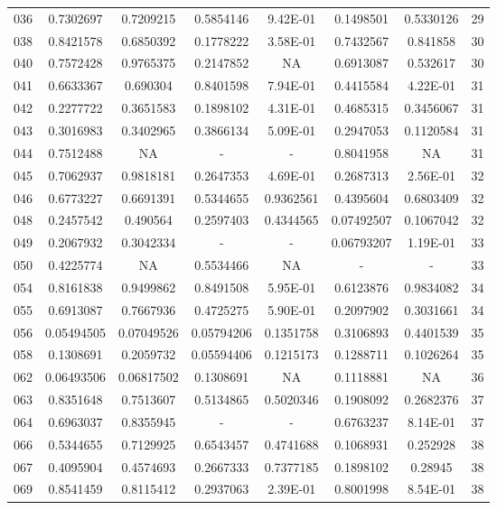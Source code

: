 \begin{anexosenv}
{\begin{longtable}{cccccccc}
036 & 0.7302697 & 0.7209215 & 0.5854146 & 9.42E-01 & 0.1498501 & 0.5330126 & 29 \\ 
038 & 0.8421578 & 0.6850392 & 0.1778222 & 3.58E-01 & 0.7432567 & 0.841858 & 30 \\ 
040 & 0.7572428 & 0.9765375 & 0.2147852 & NA & 0.6913087 & 0.532617 & 30 \\ 
041 & 0.6633367 & 0.690304 & 0.8401598 & 7.94E-01 & 0.4415584 & 4.22E-01 & 31 \\ 
042 & 0.2277722 & 0.3651583 & 0.1898102 & 4.31E-01 & 0.4685315 & 0.3456067 & 31 \\ 
043 & 0.3016983 & 0.3402965 & 0.3866134 & 5.09E-01 & 0.2947053 & 0.1120584 & 31 \\ 
044 & 0.7512488 & NA & - & - &  0.8041958 & NA & 31 \\ 
045 & 0.7062937 & 0.9818181 & 0.2647353 & 4.69E-01 & 0.2687313 & 2.56E-01 & 32 \\ 
046 & 0.6773227 & 0.6691391 & 0.5344655 & 0.9362561 & 0.4395604 & 0.6803409 & 32 \\ 
048 & 0.2457542 & 0.490564 & 0.2597403 & 0.4344565 & 0.07492507 & 0.1067042 & 32 \\ 
049 & 0.2067932 & 0.3042334 & - & - &  0.06793207 & 1.19E-01 & 33 \\ 
050 & 0.4225774 & NA & 0.5534466 & NA & - & - &  33 \\ 
054 & 0.8161838 & 0.9499862 & 0.8491508 & 5.95E-01 & 0.6123876 & 0.9834082 & 34 \\ 
055 & 0.6913087 & 0.7667936 & 0.4725275 & 5.90E-01 & 0.2097902 & 0.3031661 & 34 \\ 
056 & 0.05494505 & 0.07049526 & 0.05794206 & 0.1351758 & 0.3106893 & 0.4401539 & 35 \\ 
058 & 0.1308691 & 0.2059732 & 0.05594406 & 0.1215173 & 0.1288711 & 0.1026264 & 35 \\ 
062 & 0.06493506 & 0.06817502 & 0.1308691 & NA & 0.1118881 & NA & 36 \\ 
063 & 0.8351648 & 0.7513607 & 0.5134865 & 0.5020346 & 0.1908092 & 0.2682376 & 37 \\ 
064 & 0.6963037 & 0.8355945 & - & - &  0.6763237 & 8.14E-01 & 37 \\ 
066 & 0.5344655 & 0.7129925 & 0.6543457 & 0.4741688 & 0.1068931 & 0.252928 & 38 \\ 
067 & 0.4095904 & 0.4574693 & 0.2667333 & 0.7377185 & 0.1898102 & 0.28945 & 38 \\ 
069 & 0.8541459 & 0.8115412 & 0.2937063 & 2.39E-01 & 0.8001998 & 8.54E-01 & 38 \\ 

\end{longtable}}
\end{anexosenv}
